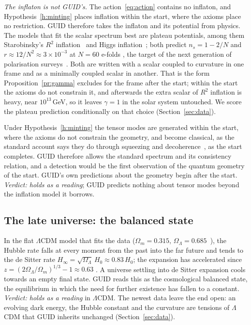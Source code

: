\emph{The inflaton is not GUID's.} The action~\eqref{eq:action} contains no inflaton, and Hypothesis~\ref{h:minting} places inflation
within the start, where the axioms place no restriction. GUID therefore takes the inflaton and its potential from physics. The models that
fit the scalar spectrum best are plateau potentials, among them Starobinsky's $R^2$ inflation~\cite{starobinsky80} and Higgs
inflation~\cite{bezrukov}; both predict $n_s=1-2/N$ and $r\approx12/N^2\approx3\times10^{-3}$ at $N=60$ e-folds , the target of the
next generation of polarisation surveys~\cite{litebird}. Both are written with a scalar coupled to curvature in one frame and as a
minimally coupled scalar in another. That is the form Proposition~\ref{pr:gamma} excludes for the frame after the start; within the start
the axioms do not constrain it, and afterwards the extra scalar of $R^2$ inflation is heavy, near $10^{13}$\,GeV, so it leaves $\gamma=1$
in the solar system untouched. We score the plateau prediction conditionally on that choice (Section~\ref{sec:data}).

Under Hypothesis~\ref{h:minting} the tensor modes are generated within the start, where the axioms do not constrain the geometry, and
become classical, as the standard account says they do through squeezing and decoherence~\cite{polarski}, as the start completes. GUID
therefore allows the standard spectrum and its consistency relation, and a detection would be the first observation of the quantum
geometry of the start. GUID's own predictions about the geometry begin after the start. \emph{Verdict: holds as a reading}; GUID
predicts nothing about tensor modes beyond the inflation model it borrows.

\subsection{The late universe: the balanced state}

In the flat $\Lambda$CDM model that fits the data ($\Omega_m=0.315$, $\Omega_\Lambda=0.685$~\cite{planck18}), the Hubble rate falls at every
moment from the past into the far future and tends to the de Sitter rate $H_\infty=\sqrt{\Omega_\Lambda}\,H_0\approx0.83\,H_0$; the expansion
has accelerated since $z=(2\Omega_\Lambda/\Omega_m)^{1/3}-1\approx0.63$ . A universe settling into de Sitter expansion cools towards
an empty final state. GUID reads this as the cosmological balanced state, the equilibrium in which the need for further existence has
fallen to a constant. \emph{Verdict: holds as a reading} in $\Lambda$CDM. The newest data leave the end open: an evolving dark energy,
the Hubble constant and the curvature are tensions of $\Lambda$CDM that GUID inherits unchanged (Section~\ref{sec:data}).

